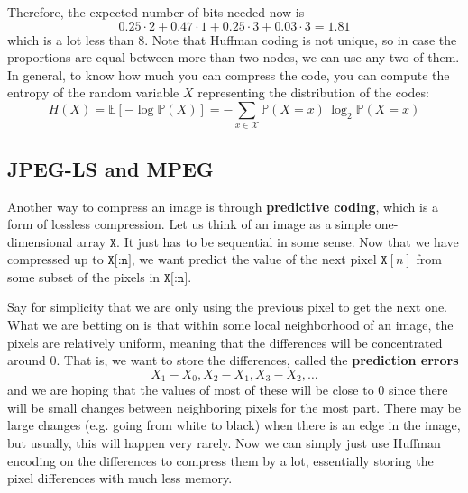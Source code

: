 \documentclass{article}
\begin{document}
    Therefore, the expected number of bits needed now is 
    \[0.25 \cdot 2 + 0.47 \cdot 1 + 0.25 \cdot 3 + 0.03 \cdot 3 = 1.81\]
    which is a lot less than $8$. Note that Huffman coding is not unique, so in case the proportions are equal between more than two nodes, we can use any two of them. In general, to know how much you can compress the code, you can compute the entropy of the random variable $X$ representing the distribution of the codes: 
    \[H(X) = \mathbb{E}[-\log \mathbb{P}(X)] = - \sum_{x \in \mathcal{X}} \mathbb{P}(X = x) \, \log_2 \mathbb{P}(X = x)\]

  \subsection{JPEG-LS and MPEG}

    Another way to compress an image is through \textbf{predictive coding}, which is a form of lossless compression. Let us think of an image as a simple one-dimensional array $\texttt{X}$. It just has to be sequential in some sense. Now that we have compressed up to $\texttt{X[:n]}$, we want predict the value of the next pixel $\texttt{X}[n]$ from some subset of the pixels in $\texttt{X[:n]}$. 

    Say for simplicity that we are only using the previous pixel to get the next one. What we are betting on is that within some local neighborhood of an image, the pixels are relatively uniform, meaning that the differences will be concentrated around $0$. That is, we want to store the differences, called the \textbf{prediction errors}
    \[X_1 - X_0, X_2 - X_1, X_3 - X_2, \ldots\]
    and we are hoping that the values of most of these will be close to $0$ since there will be small changes between neighboring pixels for the most part. There may be large changes (e.g. going from white to black) when there is an edge in the image, but usually, this will happen very rarely. Now we can simply just use Huffman encoding on the differences to compress them by a lot, essentially storing the pixel differences with much less memory. 
\end{document}
